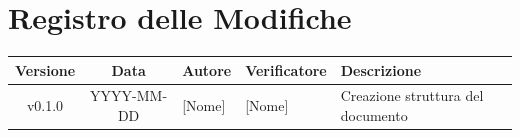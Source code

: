 \section*{Registro delle Modifiche}
\begin{table}[ht]
	\centering
	\renewcommand{\arraystretch}{1.5}
	\begin{tabularx}{\textwidth}{c c l l X}
		\toprule
		\textbf{Versione} & \textbf{Data} & \textbf{Autore} & \textbf{Verificatore} & \textbf{Descrizione} \\
		\midrule
		v0.1.0 & YYYY-MM-DD & {[Nome]} & {[Nome]} & Creazione struttura del documento \\
		\bottomrule
	\end{tabularx}
\end{table}